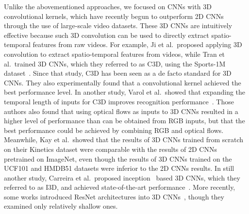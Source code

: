 \documentclass[10pt,twocolumn,letterpaper]{article}
\begin{document}
    Unlike the abovementioned approaches,
    we focused on CNNs with 3D convolutional kernels,
    which have recently begun to outperform 2D CNNs through the use of large-scale video datasets.
    These 3D CNNs are intuitively effective
    because such 3D convolution can be used to directly extract spatio-temporal features from raw videos.
    For example, Ji et al.\ proposed applying 3D convolution to extract spatio-temporal features from videos,
    while Tran et al.\ trained 3D CNNs, which they referred to as C3D, using the Sports-1M dataset~\cite{KarpathyCVPR14}.
    Since that study, C3D has been seen as a de facto standard for 3D CNNs.
    They also experimentally found that a  convolutional kernel achieved the best performance level.
    In another study, Varol et al.\ showed that expanding the temporal length of inputs for C3D improves recognition performance~\cite{LongTermTemporalConv}.
    Those authors also found that using optical flows as inputs to 3D CNNs resulted in a higher level of performance than can be obtained from RGB inputs,
    but that the best performance could be achieved by combining RGB and optical flows.
    Meanwhile, Kay et al.\ showed that the results of 3D CNNs trained from scratch on their Kinetics dataset were comparable with
    the results of 2D CNNs pretrained on ImageNet,
    even though the results of 3D CNNs trained on the UCF101 and HMDB51 datasets were inferior to the 2D CNNs results.
    In still another study, Carreira et al.\ proposed inception~\cite{Inception} based 3D CNNs, which they referred to as I3D,
    and achieved state-of-the-art performance~\cite{I3D}.
    More recently, some works introduced ResNet architectures into 3D CNNs~\cite{Hara_2017_ICCV_Workshops,res3d},
    though they examined only relatively shallow ones.
\end{document}
